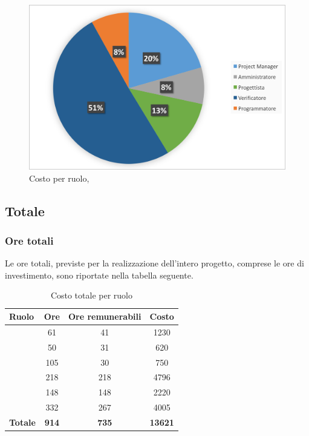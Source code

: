 \begin{figure}[H]
	\centering 
	\includegraphics[scale=0.7]{Immagini/GraficiTorteSezione6/VV.png}
	\caption{Costo per ruolo, \VV}
\end{figure}

\newpage
\subsection{Totale}
\subsubsection{Ore totali}
Le ore totali, previste per la realizzazione dell'intero progetto, comprese le ore di investimento, sono riportate nella tabella seguente.

\begin{table}[h]
	\begin{center}
		\begin{tabular}{|l|c|c|c|}
			\hline
			\textbf{Ruolo}	& \textbf{Ore} &	\textbf{Ore remunerabili}	 &\textbf{Costo} \\
			\hline
			\textit{\Pm}	&	61	&	41	&	1230	\\
			\hline
			\textit{\Am}	&	50	&	31	&	620	\\
			\hline
			\textit{\An}	&	105	&	30	&	750	\\
			\hline
			\textit{\Prog}	&	218	&	218	&	4796	\\
			\hline
			\textit{\Progr}	&	148	&	148	&	2220	\\
			\hline
			\textit{\Ver}	&	332	&	267	&	4005	\\
			\hline
			\textbf{Totale}	&	\textbf{914} & \textbf{735} & \textbf{13621}	\\
			\hline
		\end{tabular}
	\end{center}
	\caption{Costo totale per ruolo}
\end{table}

